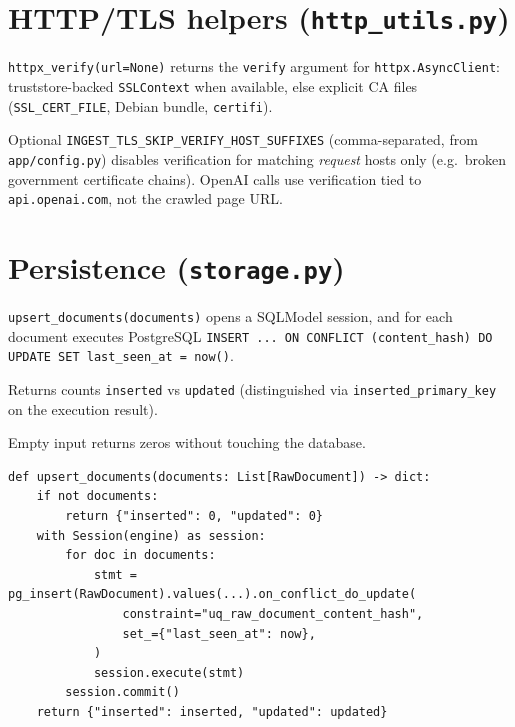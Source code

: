 \documentclass[11pt,a4paper]{article}
\begin{document}
\section{HTTP/TLS helpers (\texttt{http\_utils.py})}

\texttt{httpx\_verify(url=None)} returns the \texttt{verify} argument for \texttt{httpx.AsyncClient}:
truststore-backed \texttt{SSLContext} when available, else explicit CA files
(\texttt{SSL\_CERT\_FILE}, Debian bundle, \texttt{certifi}).

Optional \texttt{INGEST\_TLS\_SKIP\_VERIFY\_HOST\_SUFFIXES} (comma-separated, from
\texttt{app/config.py}) disables verification for matching \textit{request} hosts only
(e.g.\ broken government certificate chains). OpenAI calls use verification tied to
\texttt{api.openai.com}, not the crawled page URL.

\section{Persistence (\texttt{storage.py})}

\texttt{upsert\_documents(documents)} opens a SQLModel session, and for each document executes PostgreSQL \texttt{INSERT ... ON CONFLICT (content\_hash) DO UPDATE SET last\_seen\_at = now()}.

Returns counts \texttt{inserted} vs \texttt{updated} (distinguished via
\texttt{inserted\_primary\_key} on the execution result).

Empty input returns zeros without touching the database.

\begin{lstlisting}[caption={Upsert pattern (conceptual; see \texttt{storage.py} for full SQLAlchemy API).}]
def upsert_documents(documents: List[RawDocument]) -> dict:
    if not documents:
        return {"inserted": 0, "updated": 0}
    with Session(engine) as session:
        for doc in documents:
            stmt = pg_insert(RawDocument).values(...).on_conflict_do_update(
                constraint="uq_raw_document_content_hash",
                set_={"last_seen_at": now},
            )
            session.execute(stmt)
        session.commit()
    return {"inserted": inserted, "updated": updated}
\end{lstlisting}
\end{document}
